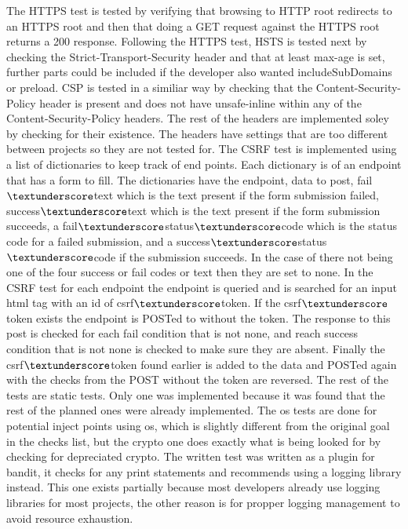 The HTTPS test is tested by verifying that browsing to HTTP root redirects to an HTTPS root and then that doing a GET request against the HTTPS root returns a 200 response. Following the HTTPS test,
HSTS is tested next by checking the Strict-Transport-Security header and that at least max-age is set, further parts could be included if the developer also wanted includeSubDomains or preload. CSP
is tested in a similiar way by checking that the Content-Security-Policy header is present and does not have unsafe-inline within any of the Content-Security-Policy headers. The rest of the headers
are implemented soley by checking for their existence. The headers have settings that are too different between projects so they are not tested for. The CSRF test is implemented using a list of
dictionaries to keep track of end points. Each dictionary is of an endpoint that has a form to fill. The dictionaries have the endpoint, data to post, fail$\textunderscore$text which is the text
present if the form submission failed, success$\textunderscore$text which is the text present if the form submission succeeds, a fail$\textunderscore$status$\textunderscore$code which is the status
code for a failed submission, and a success$\textunderscore$status$\textunderscore$code if the submission succeeds. In the case of there not being one of the four success or fail codes or text then
they are set to none. In the CSRF test for each endpoint the endpoint is queried and is searched for an input html tag with an id of csrf$\textunderscore$token. If the csrf$\textunderscore$token
exists the endpoint is POSTed to without the token. The response to this post is checked for each fail condition that is not none, and reach success condition that is not none is checked to make sure
they are absent. Finally the csrf$\textunderscore$token found earlier is added to the data and POSTed again with the checks from the POST without the token are reversed. The rest of the tests are
static tests. Only one was implemented because it was found that the rest of the planned ones were already implemented. The os tests are done for potential inject points using os, which is slightly
different from the original goal in the checks list, but the crypto one does exactly what is being looked for by checking for depreciated crypto. The written test was written as a plugin for bandit,
it checks for any print statements and recommends using a logging library instead. This one exists partially because most developers already use logging libraries for most projects, the other reason
is for propper logging management to avoid resource exhaustion.

